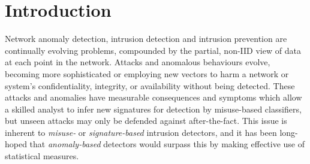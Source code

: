 \documentclass[conference, letterpaper, 10pt, times]{IEEEtran}
\title{\mytitle{}}
\author{
Anonymous Giraffe,
Anonymous Badger\\
Unnamed Department, Nowhere\\
\email{giraffe.a@unnamed.com}
}
\date{}
\begin{document}

\maketitle

\begin{abstract}
Network intrusion detection and prevention systems backed by machine learning (and the autonomous operation they promise) have been long-heralded, but face problems hampering effective deployment.
The detection problem in this domain is fraught with difficulty; it is an evolving, non-stationary problem as usage patterns shift, new protocols and applications are introduced, and is compounded by burstiness and seasonal variation.

\emph{Reinforcement learning} (RL) may overcome the detection problem for certain classes of anomaly by managing and monitoring \emph{consequences}; an agent's role is to learn to optimise performance criteria (which are always available).

?? We explore the design space, and improve upon existing approaches.

We present...
?? Contribs

?? Taking up space to figure out how much room I have for an intro

?? still taking up space...

?? still going...

?? done...
\end{abstract}

\section{Introduction}

Network anomaly detection, intrusion detection and intrusion prevention are continually evolving problems, compounded by the partial, non-IID view of data at each point in the network.
Attacks and anomalous behaviours evolve, becoming more sophisticated or employing new vectors to harm a network or system's confidentiality, integrity, or availability without being detected.
These attacks and anomalies have measurable consequences and symptoms which allow a skilled analyst to infer new signatures for detection by misuse-based classifiers, but unseen attacks may only be defended against after-the-fact.
This issue is inherent to \emph{misuse-} or \emph{signature-based} intrusion detectors, and it has been long-hoped that \emph{anomaly-based} detectors would surpass this by making effective use of statistical measures.
\end{document}
